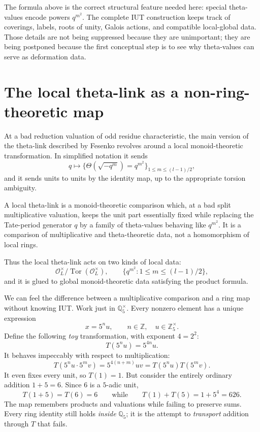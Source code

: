 \begin{remark}
The formula above is the correct structural feature needed here: special theta-values encode powers \(q^{m^2}\).  The complete IUT construction keeps track of coverings, labels, roots of unity, Galois actions, and compatible local-global data.  Those details are not being suppressed because they are unimportant; they are being postponed because the first conceptual step is to see why theta-values can serve as deformation data.
\end{remark}

\section{The local theta-link as a non-ring-theoretic map}

At a bad reduction valuation of odd residue characteristic, the main version of the theta-link described by Fesenko revolves around a local monoid-theoretic transformation.  In simplified notation it sends
\[
  q\longmapsto
  \bigl\{\Theta(\sqrt{-q^m})=q^{m^2}\bigr\}_{1\leq m\leq (l-1)/2},
\]
and it sends units to units by the identity map, up to the appropriate torsion ambiguity.

\begin{definition}
A local theta-link is a monoid-theoretic comparison which, at a bad split multiplicative valuation, keeps the unit part essentially fixed while replacing the Tate-period generator \(q\) by a family of theta-values behaving like \(q^{m^2}\).  It is a comparison of multiplicative and theta-theoretic data, not a homomorphism of local rings.
\end{definition}

Thus the local theta-link acts on two kinds of local data:
\[
  \mathcal O_L^{\times}/\operatorname{Tor}(\mathcal O_L^{\times}),
  \qquad
  \bigl\{q^{m^2}:1\leq m\leq (l-1)/2\bigr\},
\]
and it is glued to global monoid-theoretic data satisfying the product formula.

We can feel the difference between a multiplicative comparison and a ring map without knowing IUT. Work just in $\mathbb Q_5^\times$. Every nonzero element has a unique expression
\[
 x=5^n u,\qquad n\in\mathbb Z,\quad u\in\mathbb Z_5^\times.
\]
Define the following \emph{toy} transformation, with exponent $4=2^2$:
\[
 T(5^nu)=5^{4n}u.
\]
It behaves impeccably with respect to multiplication:
\[
 T(5^nu\cdot 5^mv)=5^{4(n+m)}uv=T(5^nu)T(5^mv).
\]
It even fixes every unit, so $T(1)=1$. But consider the entirely ordinary addition $1+5=6$. Since $6$ is a $5$-adic unit,
\[
 \boxed{T(1+5)=T(6)=6
 \qquad\text{while}\qquad
 T(1)+T(5)=1+5^4=626.}
\]
The map remembers products and valuations while failing to preserve sums. Every ring identity still holds \emph{inside} $\mathbb Q_5$; it is the attempt to \emph{transport} addition through $T$ that fails.

